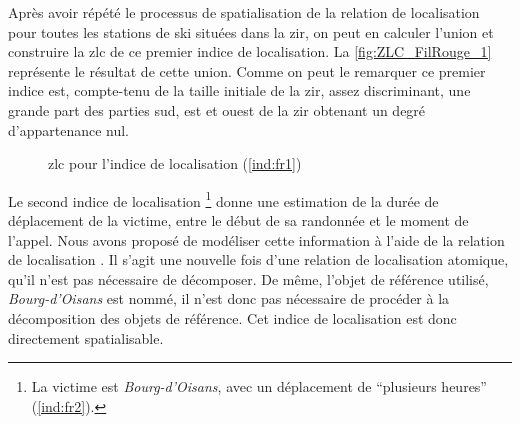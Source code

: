 Après avoir répété le processus de spatialisation de la relation de
localisation  pour
toutes les stations de ski situées dans la \ac{zir}, on peut en
calculer l'union et construire la \ac{zlc} de ce premier indice de
localisation. La \autoref{fig:ZLC_FilRouge_1} représente le résultat
de cette union.
%
Comme on peut le remarquer ce premier indice est, compte-tenu de la
taille initiale de la \ac{zir}, assez discriminant, une grande part
des parties sud, est et ouest de la \ac{zir} obtenant un degré
d'appartenance nul.

\begin{figure}[h]
  \centering
  
  \caption{\ac{zlc} pour l'indice de localisation  (\ref{ind:fr1})}
  \label{fig:ZLC_FilRouge_1}
\end{figure}


Le second indice de localisation \footnote{La victime est
   \emph{Bourg-d’Oisans}, avec un
  déplacement de \enquote{plusieurs heures} (\ref{ind:fr2}).} donne
une estimation de la durée de déplacement de la victime, entre le
début de sa randonnée et le moment de l'appel. Nous avons proposé de
modéliser cette information à l'aide de la relation de localisation
. Il s'agit une nouvelle fois
d'une relation de localisation atomique, qu'il n'est pas nécessaire de
décomposer. De même, l'objet de référence utilisé,
\emph{Bourg-d'Oisans} est nommé, il n'est donc pas nécessaire de
procéder à la décomposition des objets de référence. Cet indice de
localisation est donc directement spatialisable.

